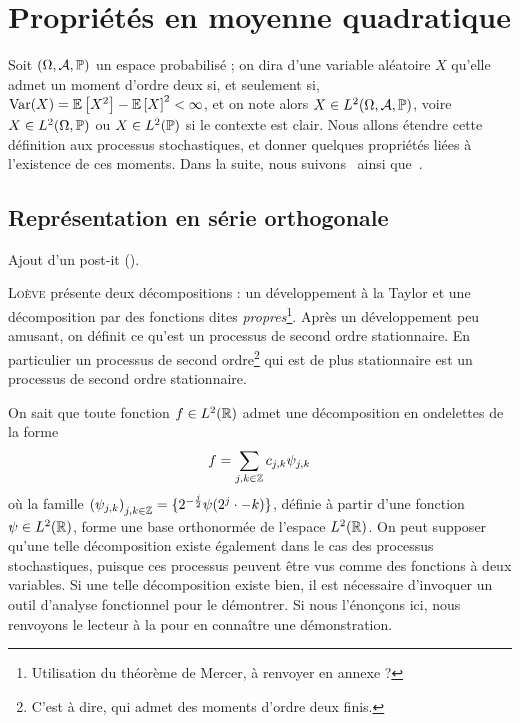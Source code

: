 \section{Propriétés en moyenne quadratique}

Soit $\left(\Omega, \Cal{A}, \P\right)$ un espace probabilisé ; on
dira d'une variable aléatoire $X$ qu'elle admet un moment d'ordre deux
si, et seulement si, $\Var(X) = \Esp{X^2}-\Esp{X}^2 <\infty$, et on
note alors $X\in L^2(\Omega, \cA, \P)$, voire $X\in L^2(\Omega, \P)$
ou $X\in L^2(\P)$ si le contexte est clair. Nous allons étendre cette
définition aux processus stochastiques, et donner quelques propriétés
liées à l'existence de ces moments. Dans la suite, nous
suivons~\cite{loeve1978} ainsi que~\cite{samorodnitsky1994}.


\subsection{Représentation en série orthogonale}

\begin{alert}
  Ajout d'un post-it (\cite[p.~143]{loeve1978}).
\end{alert}

\textsc{Loève} présente deux décompositions : un développement à la
Taylor et une décomposition par des fonctions dites
\emph{propres}\footnote{Utilisation du théorème de Mercer, à renvoyer
  en annexe ?}. Après un développement peu amusant, on définit ce
qu'est un processus de second ordre stationnaire. En particulier un
processus de second ordre\footnote{C'est à dire, qui admet des moments
  d'ordre deux finis.} qui est de plus stationnaire est un processus de
second ordre stationnaire.

On sait que toute fonction $f\in L^2(\R)$ admet une décomposition en
ondelettes de la forme
\begin{equation*}
  f = \sum_{j,k\in\Z} c_{j,k}\psi_{j,k}
\end{equation*}
où la famille
${(\psi_{j,k})}_{j,k\in\Z} = \{2^{-\frac{j}{2}}\psi(2^j\cdot-k)\}$,
définie à partir d'une fonction $\psi\in L^2(\R)$, forme une base
orthonormée de l'espace $L^2(\R)$. On peut supposer qu'une telle
décomposition existe également dans le cas des processus
stochastiques, puisque ces processus peuvent être vus comme des
fonctions à deux variables. Si une telle décomposition existe bien, il
est nécessaire d'invoquer un outil d'analyse fonctionnel pour le
démontrer. Si nous l'énonçons ici, nous renvoyons le lecteur à la
 pour en connaître une
démonstration.

